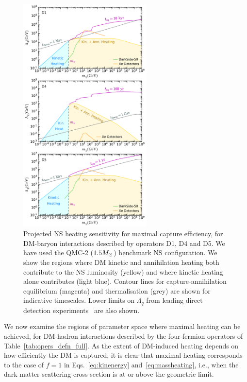 \begin{figure}[t]
    \centering
    \includegraphics[width=0.6\textwidth]{ann_heat_sensitivity_3ops.pdf}   
    \caption{
    Projected NS heating sensitivity for maximal capture efficiency, for DM-baryon interactions described by operators D1, D4 and D5.  We have used the QMC-2 ($1.5M_\odot$) benchmark NS configuration.
    We show the regions where DM kinetic and annihilation heating both contribute to the NS luminosity (yellow) and where kinetic heating alone contributes (light blue).
    Contour lines for capture-annihilation equilibrium (magenta) and thermalisation (grey) are shown for indicative timescales.    
     Lower limits on $\Lambda_q$ from leading  direct detection experiments~\cite{DarkSide:2022dhx_mar_SearchDarkMatterNucleon,XENON:2020gfr_mar_SearchCoherentElastic,PandaX-4T:2021bab_dec_DarkMatterSearch,LZ:2022lsv_jul_FirstDarkMatter} are also shown.  
    }
    \label{fig:NS_heating}
\end{figure}

We now examine the regions of parameter space where maximal heating can be achieved, for DM-hadron interactions described by the four-fermion operators of Table~\ref{tab:opers_defn_full}. As the extent of DM-induced heating depends on how efficiently the DM is captured, it is clear that maximal heating corresponds to the case of $f=1$ in Eqs.~\ref{eq:kinenergy} and~\ref{eq:massheating}, i.e., when the dark matter scattering cross-section is at or above the geometric limit. 


